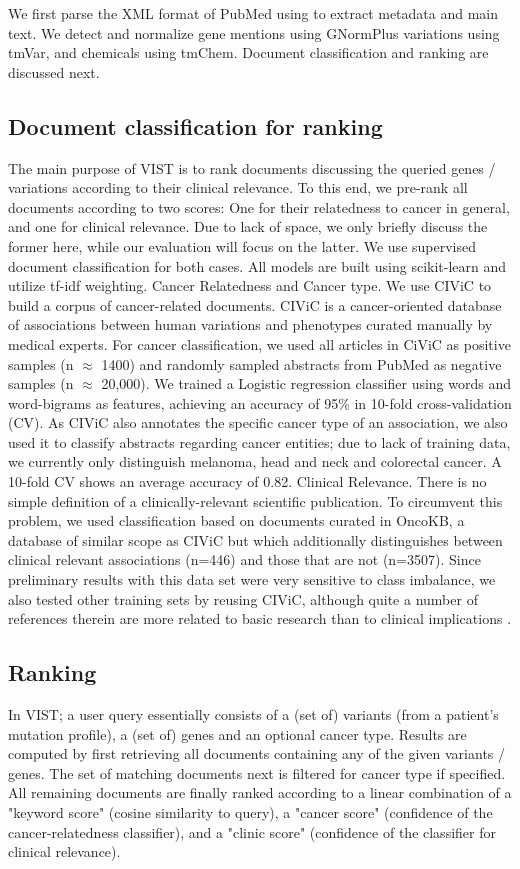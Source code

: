 \documentclass[fleqn,10pt]{wlscirep}
\begin{document}
We first parse the XML format of PubMed using \cite{Achakulvisut2016} to extract metadata and main text. We detect and normalize gene mentions using GNormPlus \cite{Wei2015a} variations using tmVar\cite{Wei2013b}, and chemicals using tmChem\cite{Leaman2015}. Document classification and ranking are discussed next. 

\subsection*{Document classification for ranking}
The main purpose of VIST is to rank documents discussing the queried genes / variations according to their clinical relevance. To this end, we pre-rank all documents according to two scores: One for their relatedness to cancer in general, and one for clinical relevance. Due to lack of space, we only briefly discuss the former here, while our evaluation will focus on the latter. We use supervised document classification for both cases. All models are built using scikit-learn\cite{sklearn} and utilize tf-idf weighting. Cancer Relatedness and Cancer type. We use CIViC to build a corpus of cancer-related documents. CIViC is a cancer-oriented database of associations between human variations and phenotypes curated manually by medical experts. For cancer classification, we used all articles in CiViC as positive samples (n $\approx$ 1400) and randomly sampled abstracts from PubMed as negative samples (n $\approx$ 20,000). We trained a Logistic regression classifier using words and word-bigrams as features, achieving an accuracy of 95\% in 10-fold cross-validation (CV). As CIViC also annotates the specific cancer type of an association, we also used it to classify abstracts regarding cancer entities; due to lack of training data, we currently only distinguish melanoma, head and neck and colorectal cancer. A 10-fold CV shows an average accuracy of 0.82. Clinical Relevance. There is no simple definition of a clinically-relevant scientific publication. To circumvent this problem, we used classification based on documents curated in OncoKB, a database of similar scope as CIViC but which additionally distinguishes between clinical relevant associations (n=446) and those that are not (n=3507). Since preliminary results with this data set were very sensitive to class imbalance, we also tested other training sets by reusing CIViC, although quite a number of references therein are more related to basic research than to clinical implications
.

\subsection*{Ranking}
In VIST; a user query essentially consists of a (set of) variants (from a patient’s mutation profile), a (set of) genes and an optional cancer type. Results are computed by first retrieving all documents containing any of the given variants / genes. The set of matching documents next is filtered for cancer type if specified. All remaining documents are finally ranked according to a linear combination of a "keyword score" (cosine similarity to query), a "cancer score" (confidence of the cancer-relatedness classifier), and a "clinic score" (confidence of the classifier for clinical relevance).
\end{document}
